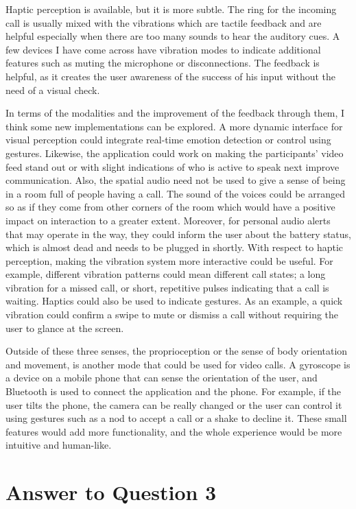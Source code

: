 \documentclass[
	letterpaper, %
]{jdf}
\begin{document}
Haptic perception is available, but it is more subtle. The ring for the incoming call is usually mixed with the vibrations which are tactile feedback and are helpful especially when there are too many sounds to hear the auditory cues. A few devices I have come across have vibration modes to indicate additional features such as muting the microphone or disconnections. The feedback is helpful, as it creates the user awareness of the success of his input without the need of a visual check.

In terms of the modalities and the improvement of the feedback through them, I think some new implementations can be explored. A more dynamic interface for visual perception could integrate real-time emotion detection or control using gestures. Likewise, the application could work on making the participants' video feed stand out or with slight indications of who is active to speak next improve communication. Also, the spatial audio need not be used to give a sense of being in a room full of people having a call. The sound of the voices could be arranged so as if they come from other corners of the room which would have a positive impact on interaction to a greater extent.  Moreover, for personal audio alerts that may operate in the way, they could inform the user about the battery status, which is almost dead and needs to be plugged in shortly. With respect to haptic perception, making the vibration system more interactive could be useful. For example, different vibration patterns could mean different call states; a long vibration for a missed call, or short, repetitive pulses indicating that a call is waiting. Haptics could also be used to indicate gestures. As an example, a quick vibration could confirm a swipe to mute or dismiss a call without requiring the user to glance at the screen.

Outside of these three senses, the proprioception or the sense of body orientation and movement, is another mode that could be used for video calls. A gyroscope is a device on a mobile phone that can sense the orientation of the user, and Bluetooth is used to connect the application and the phone. For example, if the user tilts the phone, the camera can be really changed or the user can control it using gestures such as a nod to accept a call or a shake to decline it. These small features would add more functionality, and the whole experience would be more intuitive and human-like.
\newpage

\section{Answer to Question 3}
\end{document}
